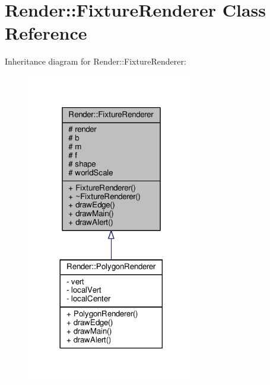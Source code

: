 \hypertarget{classRender_1_1FixtureRenderer}{}\section{Render\+:\+:Fixture\+Renderer Class Reference}
\label{classRender_1_1FixtureRenderer}


Inheritance diagram for Render\+:\+:Fixture\+Renderer\+:
\nopagebreak
\begin{figure}[H]
\begin{center}
\leavevmode
\includegraphics[width=209pt]{classRender_1_1FixtureRenderer__inherit__graph}
\end{center}
\end{figure}


